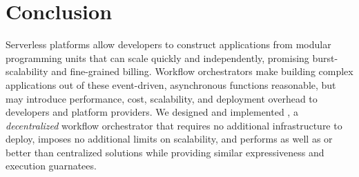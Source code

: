 %

\section{Conclusion}\label{sec:conclusion}

Serverless platforms allow developers to construct applications from modular
programming units that can scale quickly and independently, promising
burst-scalability and fine-grained billing. Workflow orchestrators make building
complex applications out of these event-driven, asynchronous functions
reasonable, but may introduce performance, cost, scalability, and deployment
overhead to developers and platform providers. We designed and implemented
\name{}, a \emph{decentralized} workflow orchestrator that requires no
additional infrastructure to deploy, imposes no additional limits on
scalability, and performs as well as or better than centralized solutions while
providing similar expressiveness and execution guarnatees.
